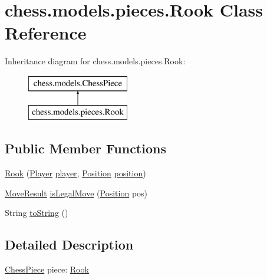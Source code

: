 \hypertarget{classchess_1_1models_1_1pieces_1_1_rook}{}\section{chess.\+models.\+pieces.\+Rook Class Reference}
\label{classchess_1_1models_1_1pieces_1_1_rook}
Inheritance diagram for chess.\+models.\+pieces.\+Rook\+:\begin{figure}[H]
\begin{center}
\leavevmode
\includegraphics[height=2.000000cm]{classchess_1_1models_1_1pieces_1_1_rook}
\end{center}
\end{figure}
\subsection*{Public Member Functions}
\begin{DoxyCompactItemize}
\item 
\mbox{\hyperlink{classchess_1_1models_1_1pieces_1_1_rook_a6a09ddec79bb71f7b497e0faf8b02152}{Rook}} (\mbox{\hyperlink{enumchess_1_1models_1_1enums_1_1_player}{Player}} \mbox{\hyperlink{classchess_1_1models_1_1_chess_piece_a3bcc8a24667318b5aab8c146adcc3eb7}{player}}, \mbox{\hyperlink{classchess_1_1models_1_1_position}{Position}} \mbox{\hyperlink{classchess_1_1models_1_1_chess_piece_a0e4f8616b75e548f269d3971846396f3}{position}})
\item 
\mbox{\hyperlink{enumchess_1_1models_1_1enums_1_1_move_result}{Move\+Result}} \mbox{\hyperlink{classchess_1_1models_1_1pieces_1_1_rook_adf20fa1c361d9122cae9fd20f543f8e4}{is\+Legal\+Move}} (\mbox{\hyperlink{classchess_1_1models_1_1_position}{Position}} pos)
\item 
String \mbox{\hyperlink{classchess_1_1models_1_1pieces_1_1_rook_a73f28ce35486a866fabe250ad4490993}{to\+String}} ()
\end{DoxyCompactItemize}


\subsection{Detailed Description}
\mbox{\hyperlink{classchess_1_1models_1_1_chess_piece}{Chess\+Piece}} piece\+: \mbox{\hyperlink{classchess_1_1models_1_1pieces_1_1_rook}{Rook}} 

